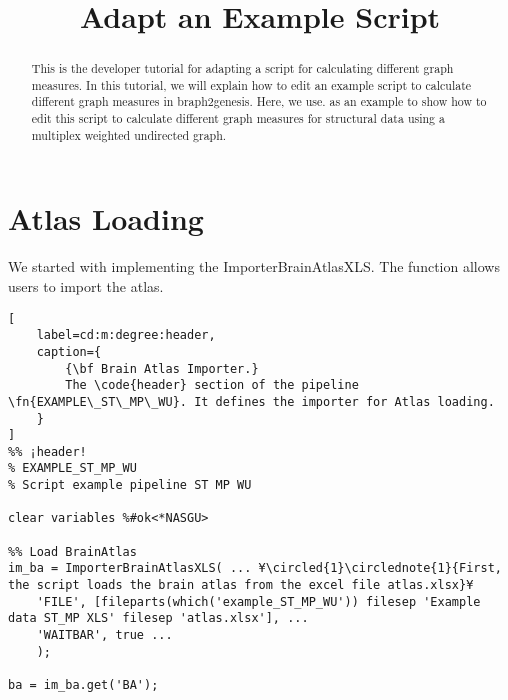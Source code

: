 \documentclass{tufte-handout}
\title{Adapt an Example Script}
\begin{document}
\maketitle

\begin{abstract}
\noindent
This is the developer tutorial for adapting a script for calculating different graph measures. In this tutorial, we will explain how to edit an example script to calculate different graph measures in braph2genesis. Here, we use.  as an example to show how to edit this script to calculate different graph measures for structural data using a multiplex weighted undirected graph.
\end{abstract}

\tableofcontents

\clearpage
\section{Atlas Loading}
We started with implementing the ImporterBrainAtlasXLS. The function allows users to import the atlas. 
\begin{lstlisting}[
	label=cd:m:degree:header,
	caption={
		{\bf Brain Atlas Importer.}
		The \code{header} section of the pipeline \fn{EXAMPLE\_ST\_MP\_WU}. It defines the importer for Atlas loading.
	}
]
%% ¡header!
% EXAMPLE_ST_MP_WU
% Script example pipeline ST MP WU

clear variables %#ok<*NASGU>

%% Load BrainAtlas
im_ba = ImporterBrainAtlasXLS( ... ¥\circled{1}\circlednote{1}{First, the script loads the brain atlas from the excel file atlas.xlsx}¥
    'FILE', [fileparts(which('example_ST_MP_WU')) filesep 'Example data ST_MP XLS' filesep 'atlas.xlsx'], ...
    'WAITBAR', true ...
    );

ba = im_ba.get('BA');
\end{lstlisting}





\end{document}
